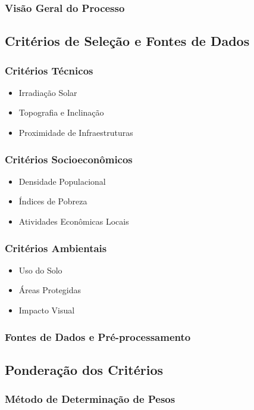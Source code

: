 \documentclass[12pt, a4paper]{article}
\begin{document}
\subsubsection{Visão Geral do Processo}

\subsection{Critérios de Seleção e Fontes de Dados}
\subsubsection{Critérios Técnicos}
\begin{itemize}
    \item Irradiação Solar
    \item Topografia e Inclinação
    \item Proximidade de Infraestruturas
\end{itemize}

\subsubsection{Critérios Socioeconômicos}
\begin{itemize}
    \item Densidade Populacional
    \item Índices de Pobreza
    \item Atividades Econômicas Locais
\end{itemize}

\subsubsection{Critérios Ambientais}
\begin{itemize}
    \item Uso do Solo
    \item Áreas Protegidas
    \item Impacto Visual
\end{itemize}

\subsubsection{Fontes de Dados e Pré-processamento}

\subsection{Ponderação dos Critérios}
\subsubsection{Método de Determinação de Pesos}
\end{document}
